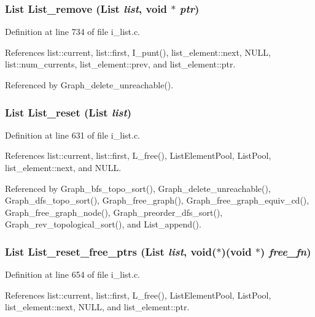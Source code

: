 \subsubsection{\setlength{\rightskip}{0pt plus 5cm}\bf{List} List\_\-remove (\bf{List} {\em list}, void $\ast$ {\em ptr})}\label{i__list_8c_ecdf7dfe2ee0a85daf3b6078d1dff1ba}




Definition at line 734 of file i\_\-list.c.

References list::current, list::first, I\_\-punt(), list\_\-element::next, NULL, list::num\_\-currents, list\_\-element::prev, and list\_\-element::ptr.

Referenced by Graph\_\-delete\_\-unreachable().
\subsubsection{\setlength{\rightskip}{0pt plus 5cm}\bf{List} List\_\-reset (\bf{List} {\em list})}\label{i__list_8c_8b86c31b4d78f4857f6d8f5567985ce8}




Definition at line 631 of file i\_\-list.c.

References list::current, list::first, L\_\-free(), List\-Element\-Pool, List\-Pool, list\_\-element::next, and NULL.

Referenced by Graph\_\-bfs\_\-topo\_\-sort(), Graph\_\-delete\_\-unreachable(), Graph\_\-dfs\_\-topo\_\-sort(), Graph\_\-free\_\-graph(), Graph\_\-free\_\-graph\_\-equiv\_\-cd(), Graph\_\-free\_\-graph\_\-node(), Graph\_\-preorder\_\-dfs\_\-sort(), Graph\_\-rev\_\-topological\_\-sort(), and List\_\-append().
\subsubsection{\setlength{\rightskip}{0pt plus 5cm}\bf{List} List\_\-reset\_\-free\_\-ptrs (\bf{List} {\em list}, void($\ast$)(void $\ast$) {\em free\_\-fn})}\label{i__list_8c_bb3ac291dc6e469487e2c9c36c39b0c5}




Definition at line 654 of file i\_\-list.c.

References list::current, list::first, L\_\-free(), List\-Element\-Pool, List\-Pool, list\_\-element::next, NULL, and list\_\-element::ptr.
